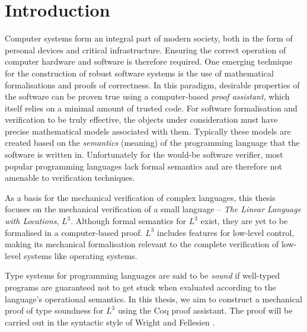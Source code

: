 \documentclass[]{unswthesis}
\begin{document}
\frontmatter  
\maketitle

\tableofcontents

\mainmatter

\chapter{Introduction}
\label{ch:intro}

Computer systems form an integral part of modern society, both in the form of personal devices and critical infrastructure. Ensuring the correct operation of computer hardware and software is therefore required. One emerging technique for the construction of robust software systems is the use of mathematical formalisations and proofs of correctness. In this paradigm, desirable properties of the software can be proven true using a computer-based \textit{proof assistant}, which itself relies on a minimal amount of trusted code. For software formalisation and verification to be truly effective, the objects under consideration must have precise mathematical models associated with them. Typically these models are created based on the \textit{semantics} (meaning) of the programming language that the software is written in. Unfortunately for the would-be software verifier, most popular programming languages lack formal semantics and are therefore not amenable to verification techniques.

As a basis for the mechanical verification of complex languages, this thesis focuses on the mechanical verification of a small language -- \textit{The Linear Language with Locations}, $L^3$. Although formal semantics for $L^3$ exist, they are yet to be formalised in a computer-based proof. $L^3$ includes features for low-level control, making its mechanical formalisation relevant to the complete verification of low-level systems like operating systems.

Type systems for programming languages are said to be \textit{sound} if well-typed programs are guaranteed not to get stuck when evaluated according to the language's operational semantics. In this thesis, we aim to construct a mechanical proof of type soundness for $L^3$ using the Coq proof assistant. The proof will be carried out in the syntactic style of Wright and Fellesien \cite{wright92}.
\end{document}
